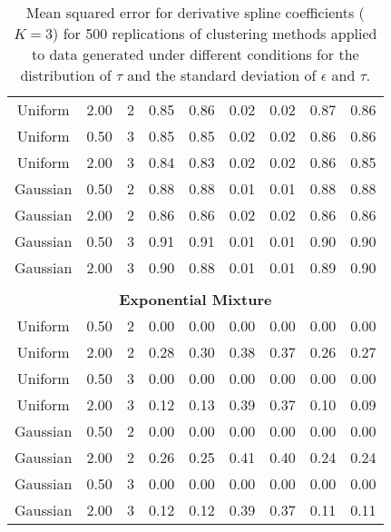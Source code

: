 \begin{table}[ht]
\begin{center}
\begin{tabular}{ccc|cccccc}
  Uniform & 2.00 &   2 & 0.85 & 0.86 & 0.02 & 0.02 & 0.87 & 0.86 \\ 
  Uniform & 0.50 &   3 & 0.85 & 0.85 & 0.02 & 0.02 & 0.86 & 0.86 \\ 
  Uniform & 2.00 &   3 & 0.84 & 0.83 & 0.02 & 0.02 & 0.86 & 0.85 \\ 
  Gaussian & 0.50 &   2 & 0.88 & 0.88 & 0.01 & 0.01 & 0.88 & 0.88 \\ 
  Gaussian & 2.00 &   2 & 0.86 & 0.86 & 0.02 & 0.02 & 0.86 & 0.86 \\ 
  Gaussian & 0.50 &   3 & 0.91 & 0.91 & 0.01 & 0.01 & 0.90 & 0.90 \\ 
  Gaussian & 2.00 &   3 & 0.90 & 0.88 & 0.01 & 0.01 & 0.89 & 0.90 \\ 
   \\ \multicolumn{9}{c}{\textbf{Exponential Mixture}}\\Uniform & 0.50 &   2 & 0.00 & 0.00 & 0.00 & 0.00 & 0.00 & 0.00 \\ 
  Uniform & 2.00 &   2 & 0.28 & 0.30 & 0.38 & 0.37 & 0.26 & 0.27 \\ 
  Uniform & 0.50 &   3 & 0.00 & 0.00 & 0.00 & 0.00 & 0.00 & 0.00 \\ 
  Uniform & 2.00 &   3 & 0.12 & 0.13 & 0.39 & 0.37 & 0.10 & 0.09 \\ 
  Gaussian & 0.50 &   2 & 0.00 & 0.00 & 0.00 & 0.00 & 0.00 & 0.00 \\ 
  Gaussian & 2.00 &   2 & 0.26 & 0.25 & 0.41 & 0.40 & 0.24 & 0.24 \\ 
  Gaussian & 0.50 &   3 & 0.00 & 0.00 & 0.00 & 0.00 & 0.00 & 0.00 \\ 
  Gaussian & 2.00 &   3 & 0.12 & 0.12 & 0.39 & 0.37 & 0.11 & 0.11 \\ 
   \hline\end{tabular}
\caption{Mean squared error for derivative spline coefficients ($K=3$) for 500 replications of clustering methods applied to data generated under different conditions for the distribution of $\tau$ and the standard deviation of $\epsilon$ and $\tau$.}
\label{tab:mse1}
\end{center}
\end{table}
